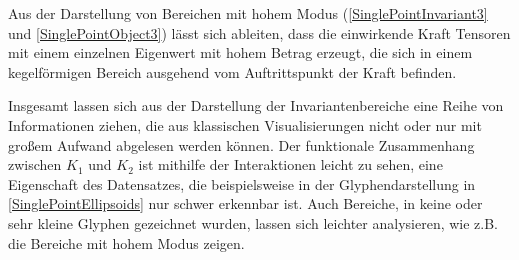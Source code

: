 \documentclass[a4paper,fontsize=12pt,toc=bib,halfparskip]{scrartcl}
\begin{document}
Aus der Darstellung von Bereichen mit hohem Modus (\ref{SinglePointInvariant3} und \ref{SinglePointObject3}) l\"asst sich ableiten, dass die einwirkende Kraft Tensoren mit einem einzelnen Eigenwert mit hohem Betrag erzeugt, die sich in einem kegelf\"ormigen Bereich ausgehend vom Auftrittspunkt der Kraft befinden.

Insgesamt lassen sich aus der Darstellung der Invariantenbereiche eine Reihe von Informationen ziehen, die aus klassischen Visualisierungen nicht oder nur mit gro{\ss}em Aufwand abgelesen werden k\"onnen. Der funktionale Zusammenhang zwischen $K_1$ und $K_2$ ist mithilfe der Interaktionen leicht zu sehen, eine Eigenschaft des Datensatzes, die beispielsweise in der Glyphendarstellung in \ref{SinglePointEllipsoids} nur schwer erkennbar ist. Auch Bereiche, in keine oder sehr kleine Glyphen gezeichnet wurden, lassen sich leichter analysieren, wie z.B. die Bereiche mit hohem Modus zeigen. 
\end{document}
